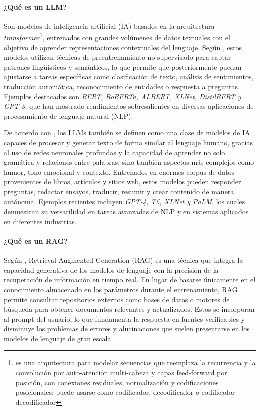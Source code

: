 \paragraph{¿Qué es un LLM?}
Son modelos de inteligencia artificial (IA) basados en la arquitectura \textit{transformer}\footnote{es una arquitectura para modelar secuencias que reemplaza la recurrencia y la convolución por auto-atención multi-cabeza y 
capas feed-forward por posición, con conexiones residuales, normalización y codificaciones posicionales; puede usarse como codificador, decodificador o codificador-decodificador}, entrenados con grandes volúmenes de datos textuales con el objetivo de aprender representaciones
contextuales del lenguaje. Según \textcite{casola2022pretrained}, estos modelos utilizan técnicas de preentrenamiento no supervisado para captar patrones lingüísticos y semánticos,
lo que permite que posteriormente puedan ajustarse a tareas específicas como clasificación de texto, análisis de sentimientos, traducción automática, reconocimiento de entidades
o respuesta a preguntas. Ejemplos destacados son \textit{BERT, RoBERTa, ALBERT, XLNet, DistilBERT y GPT-3}, que han mostrado rendimientos sobresalientes en diversas aplicaciones de procesamiento de lenguaje natural (NLP).

De acuerdo con \textcite{ramdurai2025llm}, los LLMs también se definen como una clase de modelos de IA capaces de procesar y generar texto de forma similar al lenguaje humano,
gracias al uso de redes neuronales profundas y la capacidad de aprender no solo gramática y relaciones entre palabras, sino también aspectos más complejos como humor, 
tono emocional y contexto. Entrenados en enormes corpus de datos provenientes de libros, artículos y sitios web, estos modelos pueden responder preguntas, redactar ensayos,
traducir, resumir y crear contenido de manera autónoma. Ejemplos recientes incluyen \textit{GPT-4, T5, XLNet y PaLM}, los cuales demuestran su versatilidad en tareas avanzadas
de NLP y en sistemas aplicados en diferentes industrias. 

\paragraph{¿Qué es un RAG?}
Según \textcite{han2024rag}, Retrieval-Augmented Generation (RAG) es una técnica que integra la capacidad generativa de los modelos 
de lenguaje con la precisión de la recuperación de información en tiempo real. En lugar de basarse únicamente en el conocimiento almacenado en
los parámetros durante el entrenamiento, RAG permite consultar repositorios externos como bases de datos o motores de búsqueda para obtener
documentos relevantes y actualizados. Estos se incorporan al prompt del usuario, lo que fundamenta la respuesta en fuentes 
verificables y disminuye los problemas de errores y alucinaciones que suelen presentarse en los modelos de lenguaje de gran escala. 

